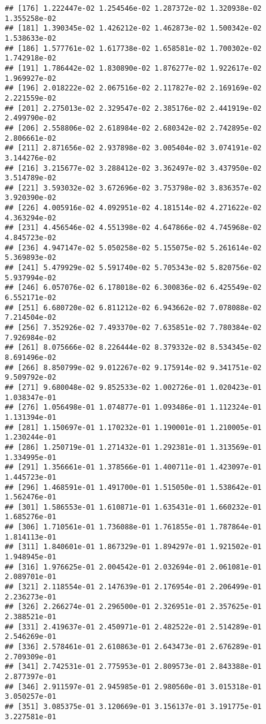 \documentclass[
]{article}
\begin{document}
\begin{verbatim}
## [176] 1.222447e-02 1.254546e-02 1.287372e-02 1.320938e-02 1.355258e-02
## [181] 1.390345e-02 1.426212e-02 1.462873e-02 1.500342e-02 1.538633e-02
## [186] 1.577761e-02 1.617738e-02 1.658581e-02 1.700302e-02 1.742918e-02
## [191] 1.786442e-02 1.830890e-02 1.876277e-02 1.922617e-02 1.969927e-02
## [196] 2.018222e-02 2.067516e-02 2.117827e-02 2.169169e-02 2.221559e-02
## [201] 2.275013e-02 2.329547e-02 2.385176e-02 2.441919e-02 2.499790e-02
## [206] 2.558806e-02 2.618984e-02 2.680342e-02 2.742895e-02 2.806661e-02
## [211] 2.871656e-02 2.937898e-02 3.005404e-02 3.074191e-02 3.144276e-02
## [216] 3.215677e-02 3.288412e-02 3.362497e-02 3.437950e-02 3.514789e-02
## [221] 3.593032e-02 3.672696e-02 3.753798e-02 3.836357e-02 3.920390e-02
## [226] 4.005916e-02 4.092951e-02 4.181514e-02 4.271622e-02 4.363294e-02
## [231] 4.456546e-02 4.551398e-02 4.647866e-02 4.745968e-02 4.845723e-02
## [236] 4.947147e-02 5.050258e-02 5.155075e-02 5.261614e-02 5.369893e-02
## [241] 5.479929e-02 5.591740e-02 5.705343e-02 5.820756e-02 5.937994e-02
## [246] 6.057076e-02 6.178018e-02 6.300836e-02 6.425549e-02 6.552171e-02
## [251] 6.680720e-02 6.811212e-02 6.943662e-02 7.078088e-02 7.214504e-02
## [256] 7.352926e-02 7.493370e-02 7.635851e-02 7.780384e-02 7.926984e-02
## [261] 8.075666e-02 8.226444e-02 8.379332e-02 8.534345e-02 8.691496e-02
## [266] 8.850799e-02 9.012267e-02 9.175914e-02 9.341751e-02 9.509792e-02
## [271] 9.680048e-02 9.852533e-02 1.002726e-01 1.020423e-01 1.038347e-01
## [276] 1.056498e-01 1.074877e-01 1.093486e-01 1.112324e-01 1.131394e-01
## [281] 1.150697e-01 1.170232e-01 1.190001e-01 1.210005e-01 1.230244e-01
## [286] 1.250719e-01 1.271432e-01 1.292381e-01 1.313569e-01 1.334995e-01
## [291] 1.356661e-01 1.378566e-01 1.400711e-01 1.423097e-01 1.445723e-01
## [296] 1.468591e-01 1.491700e-01 1.515050e-01 1.538642e-01 1.562476e-01
## [301] 1.586553e-01 1.610871e-01 1.635431e-01 1.660232e-01 1.685276e-01
## [306] 1.710561e-01 1.736088e-01 1.761855e-01 1.787864e-01 1.814113e-01
## [311] 1.840601e-01 1.867329e-01 1.894297e-01 1.921502e-01 1.948945e-01
## [316] 1.976625e-01 2.004542e-01 2.032694e-01 2.061081e-01 2.089701e-01
## [321] 2.118554e-01 2.147639e-01 2.176954e-01 2.206499e-01 2.236273e-01
## [326] 2.266274e-01 2.296500e-01 2.326951e-01 2.357625e-01 2.388521e-01
## [331] 2.419637e-01 2.450971e-01 2.482522e-01 2.514289e-01 2.546269e-01
## [336] 2.578461e-01 2.610863e-01 2.643473e-01 2.676289e-01 2.709309e-01
## [341] 2.742531e-01 2.775953e-01 2.809573e-01 2.843388e-01 2.877397e-01
## [346] 2.911597e-01 2.945985e-01 2.980560e-01 3.015318e-01 3.050257e-01
## [351] 3.085375e-01 3.120669e-01 3.156137e-01 3.191775e-01 3.227581e-01

\end{verbatim}
\end{document}
